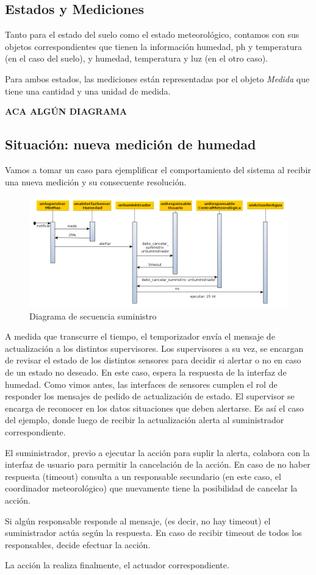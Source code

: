 \subsection{Estados y Mediciones}
Tanto para el estado del suelo como el estado meteorológico, contamos con sus objetos correspondientes que tienen la información humedad, ph y temperatura (en el caso del suelo), y humedad, temperatura y luz (en el otro caso).

Para ambos estados, las mediciones están representadas por el objeto \textit{Medida} que  tiene una cantidad y una unidad de medida.

\textbf{ACA ALGÚN DIAGRAMA}



\subsection{Situación: nueva medición de humedad}
Vamos a tomar un caso para ejemplificar el comportamiento del sistema al recibir una nueva medición y su consecuente resolución.

\begin{figure}[h!]
  \centering
  \includegraphics[width=1\textwidth]{./imagenes/secuencia_suministro1.png}
  \caption{Diagrama de secuencia suministro}
  \label{fig:sec_sum1}
\end{figure}

A medida que transcurre el tiempo, el temporizador envía el mensaje de actualización a los distintos supervisores. 
Los supervisores a su vez, se encargan de revisar el estado de los distintos sensores para decidir si alertar o no en caso de un estado no deseado.
En este caso, espera la respuesta de la interfaz de humedad. Como vimos antes, las interfaces de sensores cumplen el rol de responder los mensajes de pedido de actualización de estado. 
El supervisor se encarga de reconocer en los datos situaciones que deben alertarse. Es así el caso del ejemplo, donde luego de recibir la actualización alerta al suministrador correspondiente.

El suministrador, previo a ejecutar la acción para suplir la alerta, colabora con la interfaz de usuario para permitir la cancelación de la acción. En caso de no haber respuesta (timeout) consulta a un responsable secundario (en este caso, el coordinador meteorológico) que nuevamente tiene la posibilidad de cancelar la acción.

Si algún responsable responde al mensaje, (es decir, no hay timeout) el suministrador actúa según la respuesta. En caso de recibir timeout de todos los responsables, decide efectuar la acción.

La acción la realiza finalmente, el actuador correspondiente.

